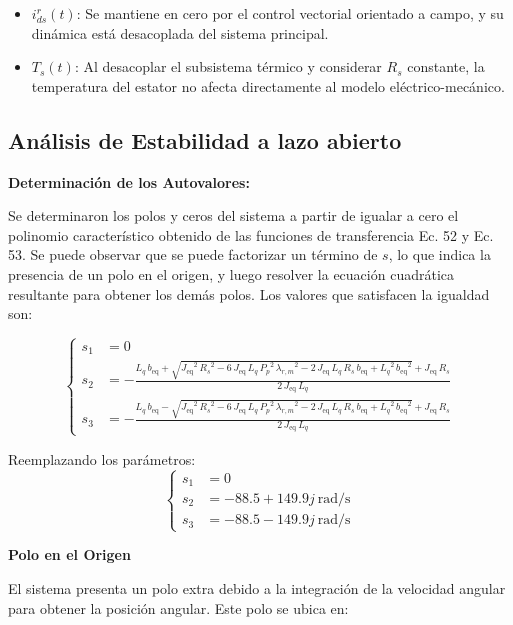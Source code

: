 \documentclass{article}
\begin{document}
\begin{itemize}
    \item \( i_{ds}^r(t) \): Se mantiene en cero por el control vectorial orientado a campo, y su dinámica está desacoplada del sistema principal.
    \item \( T_s(t) \): Al desacoplar el subsistema térmico y considerar \( R_s \) constante, la temperatura del estator no afecta directamente al modelo eléctrico-mecánico.
\end{itemize}


\subsection{Análisis de Estabilidad a lazo abierto}

\textbf{Determinación de los Autovalores:}

Se determinaron los polos y ceros del sistema a partir de igualar a cero el polinomio característico obtenido de las funciones de transferencia Ec. 52 y Ec. 53. Se puede observar que se puede factorizar un término de \( s \), lo que indica la presencia de un polo en el origen, y luego resolver la ecuación cuadrática resultante para obtener los demás polos. Los valores que satisfacen la igualdad son:

\[
\left\{
\begin{aligned}
s_1 &= 0 \\
s_2 &= -\frac{L_{q}\,b_{\mathrm{eq}}+\sqrt{{J_{\mathrm{eq}}}^2\,{R_{s}}^2 - 6\,J_{\mathrm{eq}}\,L_{q}\,{P_{p}}^2\,{\lambda_{r,m}}^2 - 2\,J_{\mathrm{eq}}\,L_{q}\,R_{s}\,b_{\mathrm{eq}} + {L_{q}}^2\,{b_{\mathrm{eq}}}^2} + J_{\mathrm{eq}}\,R_{s}}{2\,J_{\mathrm{eq}}\,L_{q}} \\
s_3 &= -\frac{L_{q}\,b_{\mathrm{eq}} - \sqrt{{J_{\mathrm{eq}}}^2\,{R_{s}}^2 - 6\,J_{\mathrm{eq}}\,L_{q}\,{P_{p}}^2\,{\lambda_{r,m}}^2 - 2\,J_{\mathrm{eq}}\,L_{q}\,R_{s}\,b_{\mathrm{eq}} + {L_{q}}^2\,{b_{\mathrm{eq}}}^2} + J_{\mathrm{eq}}\,R_{s}}{2\,J_{\mathrm{eq}}\,L_{q}}
\end{aligned}
\right.
\]

Reemplazando los parámetros:
\[
\left\{
\begin{aligned}
s_1 &= 0 \\
s_2 &= -88.5 + 149.9j \ \text{rad/s} \\
s_3 &= -88.5 - 149.9j \ \text{rad/s}
\end{aligned}
\right.
\]


\textbf{Polo en el Origen}

El sistema presenta un polo extra debido a la integración de la velocidad angular para obtener la posición angular. Este polo se ubica en:
\end{document}
